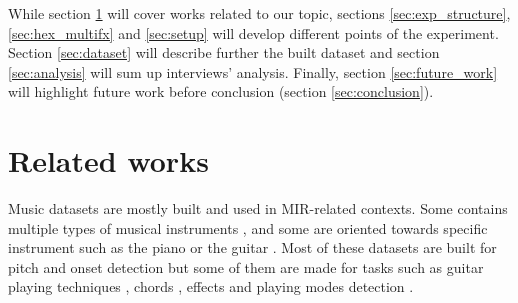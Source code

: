 \documentclass{article}
\begin{document}
While section \ref{sec:related_works} will cover works related to our topic, sections \ref{sec:exp_structure}, \ref{sec:hex_multifx} and \ref{sec:setup} will develop different points of the experiment. Section \ref{sec:dataset} will describe further the built dataset and section \ref{sec:analysis} will sum up interviews' analysis.
Finally, section \ref{sec:future_work} will highlight future work before conclusion (section \ref{sec:conclusion}).



\section{Related works}\label{sec:related_works}


Music datasets are mostly built and used in MIR-related contexts.  Some contains multiple types of musical instruments \cite{thickstun2017learning}, and some are oriented towards specific instrument such as the piano \cite{Emiya2010MAPS, hawthorne2018} or the guitar \cite{Kehling2014, sci:Xi2018}. Most of these datasets are built for pitch and onset detection but some of them are made for tasks such as guitar playing techniques \cite{sci:Su2014a}, chords \cite{nadar2019Chords}, effects \cite{Stein2010} and playing modes detection \cite{Foulon2014}. 
\end{document}
